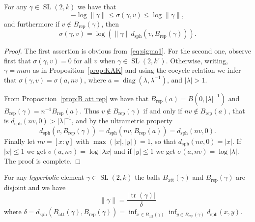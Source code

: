 \documentclass[AHL,Unicode,longabstracts]{cedram}
\DeclareMathOperator{\tr}{tr}
\DeclareMathOperator{\sph}{sph}
\DeclareMathOperator{\SL}{SL}
\DeclareMathOperator{\diag}{diag}
\newcommand{\abs}[1]{\left\vert#1\right\vert}
\newcommand{\lrpar}[1]{\left(#1\right)}
\newcommand{\la}{\lambda}
\newcommand{\att}{\mathrm{att}}
\newcommand{\rep}{\mathrm{rep}}
\newcommand{\inv}{^{-1}}
\begin{document}
\begin{lemm}\label{lem:expand vector 1}
For any $\gamma\in \SL(2,k)$ we have that
\[
- \log \|\gamma\| \le \sigma(\gamma,v) \le \log\|\gamma\|,
\]
and furthermore if $v\notin B_\rep(\gamma)$, then
\[
\sigma(\gamma,v) = \log\lrpar{\|\gamma\| d_{\mathrm{sph}}(v,B_\rep(\gamma))}.
\]
\end{lemm}

\begin{proof}
The first assertion is obvious from~\eqref{eq:sigma1}. For the second one, observe first that $\sigma(\gamma,v) = 0$ for all $v$ when $\gamma\in \SL(2,k^\circ)$. Otherwise, writing, $ \gamma = m a n$ as in Proposition~\ref{prop:KAK} and using the cocycle relation we infer that $\sigma(\gamma, v) = \sigma(a, nv)$, where $a = \diag(\lambda, \lambda^{-1})$, and $\abs{\lambda}>1$.

From Proposition~\ref{prop:B att rep} we have that $B_{\rep}(a) = B(0, \abs{\la}^{-1})$ and $B_{\rep}(\gamma) = n^{-1}B_{\rep}(a)$. Thus $v\notin B_{\rep}(\gamma)$ if and only if $nv\notin B_{\rep}(a)$, that is $d_{\mathrm{sph}}(nv, 0) > \abs{\lambda}\inv$, and by the ultrametric property
\[
d_{\mathrm{sph}}(v, B_{\rep}(\gamma)) =d_{\mathrm{sph}}(nv, B_{\rep}(a))= d_{\mathrm{sph}}(nv, 0).
\]
Finally let $nv = [x:y]$ with $\max(\abs{x}, \abs{y}) = 1$, so that $d_{\mathrm{sph}}(nv, 0) = \abs{x}$. If $\abs{x}\leq 1$ we get $\sigma(a,nv) = \log \abs{\lambda x} $ and if $\abs{y}\leq 1$ we get $\sigma(a,nv) = \log \abs{\lambda}$. The proof is complete.
\end{proof}

\begin{lemm}\label{lem:expand vector 2}
For any \emph{hyperbolic} element $\gamma\in \SL(2,k)$ the balls $B_\att(\gamma)$ and $B_\rep(\gamma)$ are disjoint and we have
\begin{equation}\label{eq:expand}
\|\gamma\| = \frac{\mathopen|\tr(\gamma)\mathclose|}{\delta}
\end{equation}
where $\delta = d_{\sph} (B_\att(\gamma), B_\rep(\gamma)) =\inf_{x\in B_\att(\gamma)} \inf_{y\in B_\rep(\gamma)} d_{\sph}(x,y)$.
\end{lemm}
\end{document}
